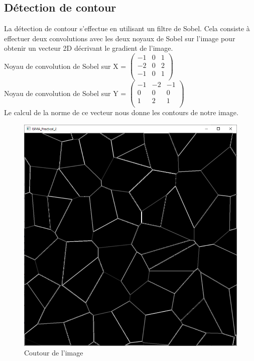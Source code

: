 \documentclass{article}
\begin{document}
\subsection{Détection de contour}
La détection de contour s'effectue en utilisant un filtre de Sobel. Cela consiste à effectuer deux convolutions avec les deux noyaux de Sobel sur l'image pour obtenir un vecteur 2D décrivant le gradient de l'image.\\
Noyau de convolution de Sobel sur X = $\begin{pmatrix}-1&0&1\\ 
-2&0&2\\ 
-1&0&1\\ 
\end{pmatrix}$\\
Noyau de convolution de Sobel sur Y = $\begin{pmatrix}-1&-2&-1\\ 
0&0&0\\ 
1&2&1\\ 
\end{pmatrix}$\\
Le calcul de la norme de ce vecteur nous donne les contours de notre image.
\begin{figure}[H]
	\centering
	\includegraphics[scale=0.4]{images/sobel.png}
	\caption{Coutour de l'image}
\end{figure}
\end{document}
